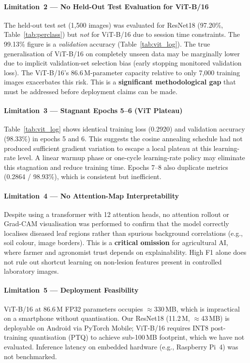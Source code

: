 \documentclass[journal]{IEEEtran}
\begin{document}
\paragraph{Limitation~2 --- No Held-Out Test Evaluation for ViT-B/16}
The held-out test set (1,500 images) was evaluated for ResNet18
(97.20\%, Table~\ref{tab:perclass}) but \emph{not} for ViT-B/16
due to session time constraints.
The 99.13\% figure is a \emph{validation} accuracy (Table~\ref{tab:vit_log}).
The true generalisation of ViT-B/16 on completely unseen data may
be marginally lower due to implicit validation-set selection bias
(early stopping monitored validation loss).
The ViT-B/16's 86.6\,M-parameter capacity relative to only 7,000
training images exacerbates this risk.
This is a \textbf{significant methodological gap} that must be
addressed before deployment claims can be made.

\paragraph{Limitation~3 --- Stagnant Epochs 5--6 (ViT Plateau)}
Table~\ref{tab:vit_log} shows identical training loss (0.2920) and
validation accuracy (98.33\%) in epochs 5 and 6.
This suggests the cosine annealing schedule had not produced
sufficient gradient variation to escape a local plateau at this
learning-rate level.
A linear warmup phase or one-cycle learning-rate policy may
eliminate this stagnation and reduce training time.
Epochs 7--8 also duplicate metrics (0.2864 / 98.93\%), which is
consistent but inefficient.

\paragraph{Limitation~4 --- No Attention-Map Interpretability}
Despite using a transformer with 12 attention heads, no attention
rollout or Grad-CAM visualisation was performed to confirm that
the model correctly localises diseased leaf regions rather than
spurious background correlations (e.g., soil colour, image borders).
This is a \textbf{critical omission} for agricultural AI, where
farmer and agronomist trust depends on explainability.
High F1 alone does not rule out shortcut learning on non-lesion
features present in controlled laboratory images.

\paragraph{Limitation~5 --- Deployment Feasibility}
ViT-B/16 at 86.6\,M FP32 parameters occupies $\approx$330\,MB,
which is impractical on a smartphone without quantisation.
Our ResNet18 (11.2\,M, $\approx$43\,MB) is deployable on Android
via PyTorch Mobile; ViT-B/16 requires INT8 post-training
quantisation (PTQ) to achieve sub-100\,MB footprint, which we
have not evaluated.
Inference latency on embedded hardware (e.g., Raspberry Pi~4)
was not benchmarked.
\end{document}
